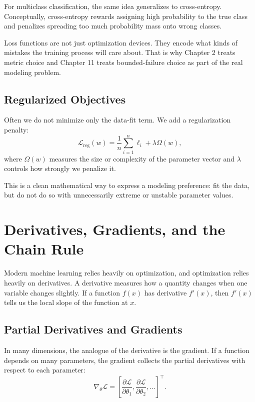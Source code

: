 For multiclass classification, the same idea generalizes to cross-entropy. Conceptually, cross-entropy rewards assigning high probability to the true class and penalizes spreading too much probability mass onto wrong classes.

\begin{mathlens}
Loss functions are not just optimization devices. They encode what kinds of mistakes the training process will care about. That is why Chapter 2 treats metric choice and Chapter 11 treats bounded-failure choice as part of the real modeling problem.
\end{mathlens}

\subsection{Regularized Objectives}

Often we do not minimize only the data-fit term. We add a regularization penalty:
\[
\mathcal{L}_{\text{reg}}(w) = \frac{1}{n}\sum_{i=1}^{n}\ell_i + \lambda \Omega(w),
\]
where $\Omega(w)$ measures the size or complexity of the parameter vector and $\lambda$ controls how strongly we penalize it.

This is a clean mathematical way to express a modeling preference: fit the data, but do not do so with unnecessarily extreme or unstable parameter values.

\section{Derivatives, Gradients, and the Chain Rule}

Modern machine learning relies heavily on optimization, and optimization relies heavily on derivatives. A derivative measures how a quantity changes when one variable changes slightly. If a function $f(x)$ has derivative $f'(x)$, then $f'(x)$ tells us the local slope of the function at $x$.

\subsection{Partial Derivatives and Gradients}

In many dimensions, the analogue of the derivative is the gradient. If a function depends on many parameters, the gradient collects the partial derivatives with respect to each parameter:
\[
\nabla_\theta \mathcal{L} =
\left[
\frac{\partial \mathcal{L}}{\partial \theta_1},
\frac{\partial \mathcal{L}}{\partial \theta_2},
\ldots
\right]^\top.
\]


